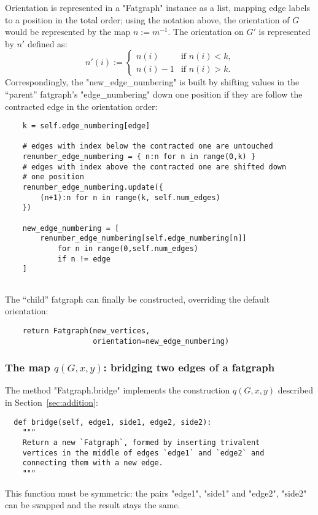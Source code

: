Orientation is represented in a "Fatgraph" instance as a list, mapping
edge labels to a position in the total order; using the notation
above, the orientation of $G$ would be represented by the map
$n := m^{-1}$.  The orientation on $G'$ is represented by $n'$ defined
as:
\begin{equation*}
  n'(i) :=
  \begin{cases}
    n(i)    &\text{if $n(i)<k$,} 
    \\
    n(i)-1  &\text{if $n(i)>k$.}
  \end{cases}
\end{equation*}
Correspondingly, the "new_edge_numbering" is built by shifting values
in the ``parent'' fatgraph's "edge_numbering" down one position if
they are follow the contracted edge in the orientation order:
\begin{lstlisting}
    k = self.edge_numbering[edge]

    # edges with index below the contracted one are untouched
    renumber_edge_numbering = { n:n for n in range(0,k) }
    # edges with index above the contracted one are shifted down
    # one position
    renumber_edge_numbering.update({ 
        (n+1):n for n in range(k, self.num_edges) 
    })

    new_edge_numbering = [ 
        renumber_edge_numbering[self.edge_numbering[n]]
            for n in range(0,self.num_edges)
            if n != edge 
    ]
    
\end{lstlisting}

The ``child'' fatgraph can finally be constructed, overriding the
default orientation:
\begin{lstlisting}
    return Fatgraph(new_vertices, 
                    orientation=new_edge_numbering)

\end{lstlisting}


\subsubsection{The map $q(G,x,y)$: bridging two edges of a fatgraph}
\label{sec:bridge}

The method "Fatgraph.bridge" implements the construction $q(G,x,y)$
described in Section~\ref{sec:addition}:
\begin{lstlisting}
  def bridge(self, edge1, side1, edge2, side2):
    """
    Return a new `Fatgraph`, formed by inserting trivalent
    vertices in the middle of edges `edge1` and `edge2` and
    connecting them with a new edge.
    """
\end{lstlisting}
This function must be symmetric: the pairs "edge1", "side1" and
"edge2", "side2" can be swapped and the result stays the same.

